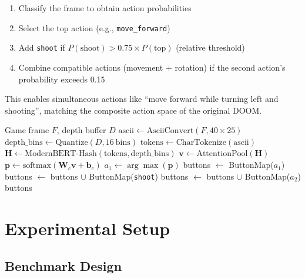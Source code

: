\documentclass[11pt,a4paper]{article}
\begin{document}
\begin{enumerate}
    \item Classify the frame to obtain action probabilities
    \item Select the top action (e.g., \texttt{move\_forward})
    \item Add \texttt{shoot} if $P(\text{shoot}) > 0.75 \times P(\text{top})$ (relative threshold)
    \item Combine compatible actions (movement + rotation) if the second action's probability exceeds 0.15
\end{enumerate}

This enables simultaneous actions like ``move forward while turning left and shooting'', matching the composite action space of the original DOOM.

\begin{algorithm}[h]
\caption{SauerkrautLM-Doom-MultiVec Inference (per frame)}
\label{alg:inference}
\begin{algorithmic}[1]
\REQUIRE Game frame $F$, depth buffer $D$
\STATE $\text{ascii} \leftarrow \text{AsciiConvert}(F, 40 \times 25)$
\STATE $\text{depth\_bins} \leftarrow \text{Quantize}(D, 16\ \text{bins})$
\STATE $\text{tokens} \leftarrow \text{CharTokenize}(\text{ascii})$ 
\STATE $\mathbf{H} \leftarrow \text{ModernBERT-Hash}(\text{tokens}, \text{depth\_bins})$
\STATE $\mathbf{v} \leftarrow \text{AttentionPool}(\mathbf{H})$ 
\STATE $\mathbf{p} \leftarrow \text{softmax}(\mathbf{W}_c \mathbf{v} + \mathbf{b}_c)$ 
\STATE $a_1 \leftarrow \arg\max(\mathbf{p})$
\STATE buttons $\leftarrow$ ButtonMap($a_1$)
    \STATE buttons $\leftarrow$ buttons $\cup$ ButtonMap(\texttt{shoot})
\ENDIF
{}
    \STATE buttons $\leftarrow$ buttons $\cup$ ButtonMap($a_2$)
\ENDIF
\RETURN buttons
\end{algorithmic}
\end{algorithm}

\section{Experimental Setup}
\label{sec:experiments}

\subsection{Benchmark Design}
\end{document}

